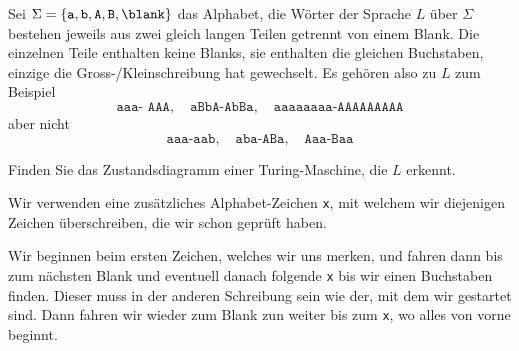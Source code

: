 Sei $\Sigma=\{\texttt{a},\texttt{b},\texttt{A},\texttt{B},\blank\}$
das Alphabet, die Wörter der Sprache $L$ über $\Sigma$ bestehen
jeweils aus zwei gleich langen Teilen getrennt von einem Blank.
Die einzelnen Teile enthalten keine Blanks,
sie enthalten die gleichen Buchstaben, einzige die
Gross-/Kleinschreibung hat gewechselt.
Es gehören also zu $L$ zum Beispiel
\[
\texttt{aaa- AAA},\quad
\texttt{aBbA-AbBa},\quad
\texttt{aaaaaaaa-AAAAAAAAA}
\]
aber nicht
\[
\texttt{aaa-aab},\quad
\texttt{aba-ABa},\quad
\texttt{Aaa-Baa}
\]

Finden Sie das Zustandsdiagramm einer Turing-Maschine, die $L$ erkennt.

\begin{loesung}
Wir verwenden eine zusätzliches Alphabet-Zeichen \texttt{x}, mit welchem
wir diejenigen Zeichen überschreiben, die wir schon geprüft haben.

Wir beginnen beim ersten Zeichen, welches wir uns merken, und fahren
dann bis zum nächsten Blank und eventuell danach folgende \texttt{x}
bis wir einen Buchstaben finden.
Dieser muss in der anderen Schreibung sein wie der, mit dem wir
gestartet sind.
Dann fahren wir wieder zum Blank zun weiter bis zum \texttt{x}, wo alles
von vorne beginnt.


\end{loesung}
